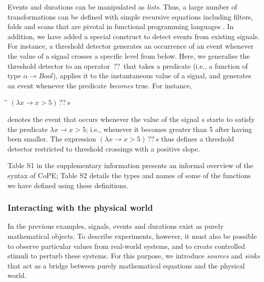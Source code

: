 \documentclass[11pt]{article}
\newlength{\lwidth}\setlength{\lwidth}{4.5cm}
\newlength{\cwidth}\setlength{\cwidth}{8mm} %
\newcommand{\Conid}[1]{\mathit{#1}}
\newcommand{\Varid}[1]{\mathit{#1}}
\begin{document}
Events and durations can be manipulated as \emph{lists}. Thus, a large
number of transformations can be defined with simple recursive
equations including filters, folds and scans that are pivotal in functional
programming languages \citep{Hughes1989}. In addition, we have added a
special construct to detect events from existing signals. For
instance, a threshold detector generates an occurrence of an event
whenever the value of a signal crosses a specific level from below.
Here, we generalise the threshold detector to an operator \ensuremath{\,??\,} that takes
a predicate (i.e., a function of type \ensuremath{\alpha\to \Conid{Bool}}), applies it to the
instantaneous value of a signal, and generates an event whenever
the predicate \emph{becomes} true. For instance,
\begin{tabbing}
\qquad\=\hspace{\lwidth}\=\hspace{\cwidth}\=\+\kill
${(\lambda \Varid{x}\to \Varid{x}\mathbin{>}\mathrm{5})\,??\,\Varid{s}}$
\end{tabbing}denotes the event that occurs whenever the value of the signal \ensuremath{\Varid{s}}
starts to satisfy the predicate \ensuremath{\lambda \Varid{x}\to \Varid{x}\mathbin{>}\mathrm{5}}; i.e., whenever it becomes greater
than 5 after having been smaller. The expression \ensuremath{(\lambda \Varid{x}\to \Varid{x}\mathbin{>}\mathrm{5})\,??\,\Varid{s}} thus defines a threshold detector restricted to threshold
crossings with a positive slope.
 
Table S1 in the supplementary information presents an informal overview of
the syntax of CoPE; Table S2 details the types and names of some of
the functions we have defined using these definitions.

\subsubsection*{Interacting with the physical world}

In the previous examples, signals, events and durations exist as purely
mathematical objects. To describe experiments, however, it must also
be possible to observe particular values from real-world systems, and to
create controlled stimuli to perturb these systems. For this purpose, we
introduce \emph{sources} and \emph{sinks} that act as a bridge between 
purely mathematical equations and the physical world.
\end{document}
